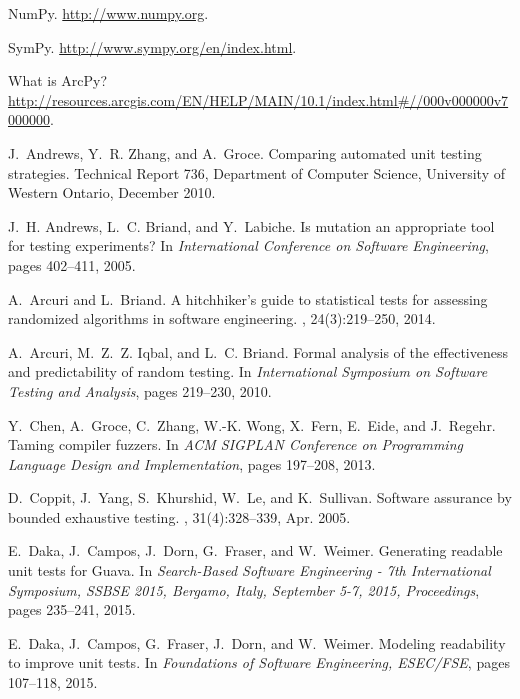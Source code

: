 \documentclass[sigconf]{acmart}
\begin{document}
\begin{thebibliography}{10}

{NumPy}.
\newblock \url{http://www.numpy.org}.

{SymPy}.
\newblock \url{http://www.sympy.org/en/index.html}.

What is {ArcPy}?
\newblock
  \url{http://resources.arcgis.com/EN/HELP/MAIN/10.1/index.html#//000v000000v7000000}.

J.~Andrews, Y.~R. Zhang, and A.~Groce.
\newblock Comparing automated unit testing strategies.
\newblock Technical Report 736, Department of Computer Science, University of
  Western Ontario, December 2010.

J.~H. Andrews, L.~C. Briand, and Y.~Labiche.
\newblock Is mutation an appropriate tool for testing experiments?
\newblock In {\em International Conference on Software Engineering}, pages
  402--411, 2005.

A.~Arcuri and L.~Briand.
\newblock A hitchhiker's guide to statistical tests for assessing randomized
  algorithms in software engineering.
, 24(3):219--250,
  2014.

A.~Arcuri, M.~Z.~Z. Iqbal, and L.~C. Briand.
\newblock Formal analysis of the effectiveness and predictability of random
  testing.
\newblock In {\em International Symposium on Software Testing and Analysis},
  pages 219--230, 2010.

Y.~Chen, A.~Groce, C.~Zhang, W.-K. Wong, X.~Fern, E.~Eide, and J.~Regehr.
\newblock Taming compiler fuzzers.
\newblock In {\em ACM SIGPLAN Conference on Programming Language Design and
  Implementation}, pages 197--208, 2013.

D.~Coppit, J.~Yang, S.~Khurshid, W.~Le, and K.~Sullivan.
\newblock Software assurance by bounded exhaustive testing.
, 31(4):328--339, Apr.
  2005.

E.~Daka, J.~Campos, J.~Dorn, G.~Fraser, and W.~Weimer.
\newblock Generating readable unit tests for {Guava}.
\newblock In {\em Search-Based Software Engineering - 7th International
  Symposium, {SSBSE} 2015, Bergamo, Italy, September 5-7, 2015, Proceedings},
  pages 235--241, 2015.

E.~Daka, J.~Campos, G.~Fraser, J.~Dorn, and W.~Weimer.
\newblock Modeling readability to improve unit tests.
\newblock In {\em Foundations of Software Engineering, {ESEC/FSE}}, pages
  107--118, 2015.


\end{thebibliography}
\end{document}
